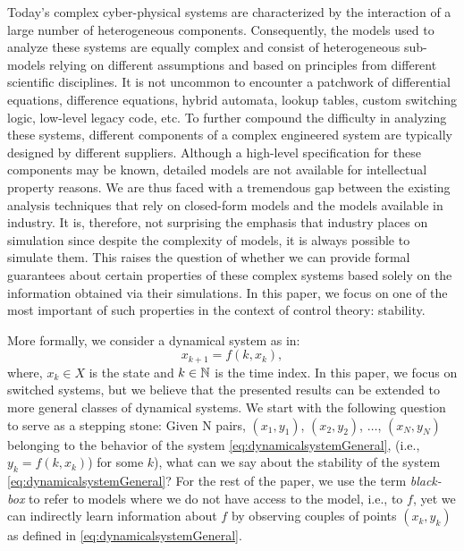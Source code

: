 Today's complex cyber-physical systems are characterized by the interaction of a large number of heterogeneous components. Consequently, the models used to analyze these systems are equally complex and consist of heterogeneous sub-models relying on different assumptions and based on principles from different scientific disciplines. It is not uncommon to encounter a patchwork of differential equations, difference equations, hybrid automata, lookup tables, custom switching logic, low-level legacy code, etc. To further compound the difficulty in analyzing these systems, different components of a complex engineered system are typically designed by different suppliers. Although a high-level specification for these components may be known, detailed models are not available for intellectual property reasons. We are thus faced with a tremendous gap between the existing analysis techniques that rely on closed-form models and the models available in industry. It is, therefore, not surprising the emphasis that industry places on simulation since despite the complexity of models, it is always possible to simulate them. This raises the question of whether we can provide formal guarantees about certain properties of these complex systems based solely on the information obtained via their simulations. In this paper, we focus on one of the most important of such properties in the context of control theory: stability.

More formally, we consider a dynamical system as in:
\begin{equation}\label{eq:dynamicalsystemGeneral}x_{k+1} = f(k, x_k),
\end{equation}
where, $x_k \in X$ is the state and $k \in \mathbb{N}$ is the time index. In this paper, we focus on switched systems, but we believe that the presented results can be extended to more general classes of dynamical systems.
We start with the following question to serve as a stepping stone: Given N pairs, $(x_1, y_1)$, $(x_2, y_2)$, $\ldots$, $(x_N, y_N)$ belonging to the behavior of the system \eqref{eq:dynamicalsystemGeneral}, (i.e., $y_{k} = f(k, x_k)$) for some $k$), what can we say about the stability of the system \eqref{eq:dynamicalsystemGeneral}? For the rest of the paper, we use the term \emph{black-box} to refer to models where we do not have access to the model, i.e., to $f$, yet we can indirectly learn information about $f$ by observing couples of points $(x_k, y_k)$ as defined in \eqref{eq:dynamicalsystemGeneral}.

